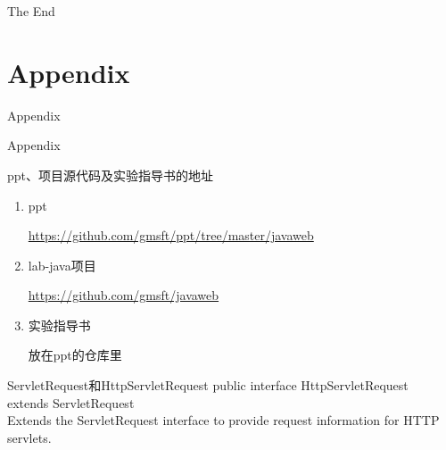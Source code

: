 \documentclass{beamer}
\begin{document}
\begin{frame}
\Huge{\centerline{The End}}
\end{frame}

\section{Appendix}

\begin{frame}
\Huge{\centerline{Appendix}}
\end{frame}
\begin{frame}{Appendix}
\begin{block}{ppt、项目源代码及实验指导书的地址}
\begin{enumerate}
\item
ppt

\url{https://github.com/gmsft/ppt/tree/master/javaweb}
\item
lab-java项目

\url{https://github.com/gmsft/javaweb}

\item
实验指导书

放在ppt的仓库里
\end{enumerate}
\end{block}
\end{frame}

\begin{frame}{ServletRequest和HttpServletRequest}
public interface HttpServletRequest\\
extends ServletRequest\\
Extends the ServletRequest interface to provide request information for HTTP servlets.
\end{frame}

\end{document}
